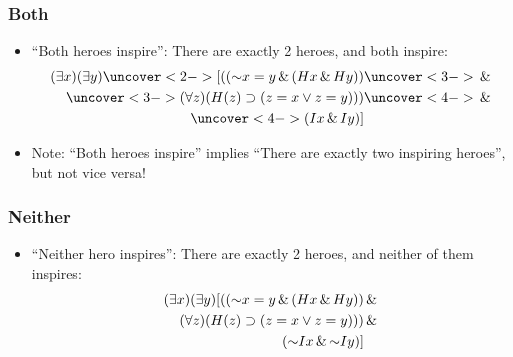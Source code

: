 \begin{frame}
    \frametitle{Both}

\begin{itemize}
\item<1-> ``Both heroes inspire'': There are exactly 2 heroes, and both inspire:
\begin{align*}
\qt{\exists}{x}\qt{\exists}{y}\uncover<2->{[((\enot x = y \land (H\qv{x} \land H\qv{y}))} & 
\uncover<3->{{} \land {}}\\
\uncover<3->{\qt{\forall}{z}(H(z) \to (z = x \lor z = y)))} & \uncover<4->{{}\land {}}\\
\uncover<4->{(I\qv{x} \eand I\qv{y})]}&
\end{align*}
\item<5-> Note: ``Both heroes inspire'' implies ``There are exactly two inspiring heroes'', but not vice versa!
\end{itemize}
\end{frame}

\begin{frame}
    \frametitle{Neither}

\begin{itemize}[<+->]
\item ``Neither hero inspires'': There are exactly 2 heroes, and neither of them inspires:
\begin{align*}
\qt{\exists}{x}\qt{\exists}{y}[((\lnot x = y \land (H\qv{x} \land H\qv{y})) & {}\land {}\\
\qt{\forall}{z}(H(z) \to (z = x \lor z = y))) &{} \land {}\\
(\enot I\qv{x} \eand \enot I\qv{y})]&
\end{align*}
\end{itemize}
\end{frame}

